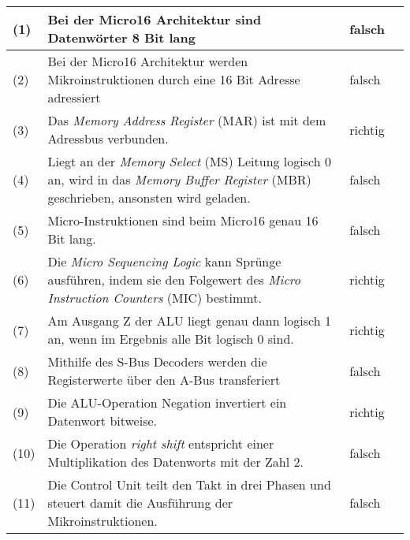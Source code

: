 \documentclass[a4paper, 12pt, margins=2cm]{homework}
\begin{document}
  
  \begin{problem}
  \end{problem}
  \begin{solution} \hfill
    \begin{center}
      \begin{tabular}{>{\centering}m{0.5cm}|m{12.5cm}|m{1.5cm}@{}l@{}}
        \hline
        (1)  & Bei der Micro16 Architektur sind Datenwörter 8 Bit lang                                                                                                   & falsch  \\[10mm] \hline
        (2)  & Bei der Micro16 Architektur werden Mikroinstruktionen durch eine 16 Bit Adresse adressiert                                                                & falsch \\[10mm] \hline
        (3)  & Das \textit{Memory Address Register} (MAR) ist mit dem Adressbus verbunden.                                                                             & richtig \\[10mm] \hline
        (4)  & Liegt an der \textit{Memory Select} (MS) Leitung logisch 0 an, wird in das \textit{Memory Buffer Register} (MBR) geschrieben, ansonsten wird geladen. & falsch  \\[10mm] \hline
        (5)  & Micro-Instruktionen sind beim Micro16 genau 16 Bit lang.                                                                                                  & falsch \\[10mm] \hline
        (6)  & Die \textit{Micro Sequencing Logic} kann Sprünge ausführen, indem sie den Folgewert des \textit{Micro Instruction Counters} (MIC) bestimmt.           & richtig \\[10mm] \hline
        (7)  & Am Ausgang Z der ALU liegt genau dann logisch 1 an, wenn im Ergebnis alle Bit logisch 0 sind.                                                             & richtig \\[10mm] \hline
        (8)  & Mithilfe des S-Bus Decoders werden die Registerwerte über den A-Bus transferiert                                                                          & falsch  \\[10mm] \hline
        (9)  & Die ALU-Operation Negation invertiert ein Datenwort bitweise.                                                                                             & richtig \\[10mm] \hline
        (10) & Die Operation \textit{right shift} entspricht einer Multiplikation des Datenworts mit der Zahl 2.                                                       & falsch  \\[10mm] \hline
        (11) & Die Control Unit teilt den Takt in drei Phasen und steuert damit die Ausführung der Mikroinstruktionen.                                                   & falsch  \\[10mm] \hline
      \end{tabular}
    \end{center}
  \end{solution}
\end{document}

